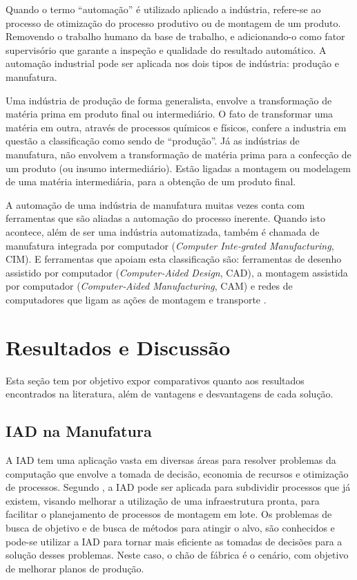\documentclass[
	article,			    %
	12pt,				    %
	oneside,			    %
	a4paper,			    %
	chapter=TITLE,		    %
	section=TITLE,		    %
	subsection=TITLE,	    %
	english,			    %
	brazil,				    %
	sumario=tradicional
]{abntex2}
\begin{document}
Quando o termo ``automação'' é utilizado aplicado a indústria, refere-se ao processo de otimização do processo produtivo ou de montagem de um produto. Removendo o trabalho humano da base de trabalho, e adicionando-o como fator supervisório que garante a inspeção e qualidade do resultado automático. A automação industrial pode ser aplicada nos dois tipos de indústria: produção e manufatura.

Uma indústria de produção de forma generalista, envolve a transformação de matéria prima em produto final ou intermediário. O fato de transformar uma matéria em outra, através de processos químicos e físicos, confere a industria em questão a classificação como sendo de ``produção''. Já as indústrias de manufatura, não envolvem a transformação de matéria prima para a confecção de um produto (ou insumo intermediário). Estão ligadas a montagem ou modelagem de uma matéria intermediária, para a obtenção de um produto final.

A automação de uma indústria de manufatura muitas vezes conta com ferramentas que são aliadas a automação do processo inerente. Quando isto acontece, além de ser uma indústria automatizada, também é chamada de manufatura integrada por computador (\emph{Computer Inte‐grated Manufacturing}, CIM). E ferramentas que apoiam esta classificação são: ferramentas de desenho assistido por computador (\emph{Computer‐Aided Design}, CAD), a montagem assistida por computador (\emph{Computer‐Aided Manufacturing}, CAM) e redes de computadores que ligam as ações de montagem e transporte \cite{groover2011automacao}.

\section{Resultados e Discussão}
Esta seção tem por objetivo expor comparativos quanto aos resultados encontrados na literatura, além de vantagens e desvantagens de cada solução.

\subsection{IAD na Manufatura}
A IAD tem uma aplicação vasta em diversas áreas para resolver problemas da computação que envolve a tomada de decisão, economia de recursos e otimização de processos. Segundo , a IAD pode ser aplicada para subdividir processos que já existem, visando melhorar a utilização de uma infraestrutura pronta, para facilitar o planejamento de processos de montagem em lote. Os problemas de busca de objetivo e de busca de métodos para atingir o alvo, são conhecidos e pode-se utilizar a IAD para tornar mais eficiente as tomadas de decisões para a solução desses problemas. Neste caso, o chão de fábrica é o cenário, com objetivo de melhorar planos de produção.
\end{document}
